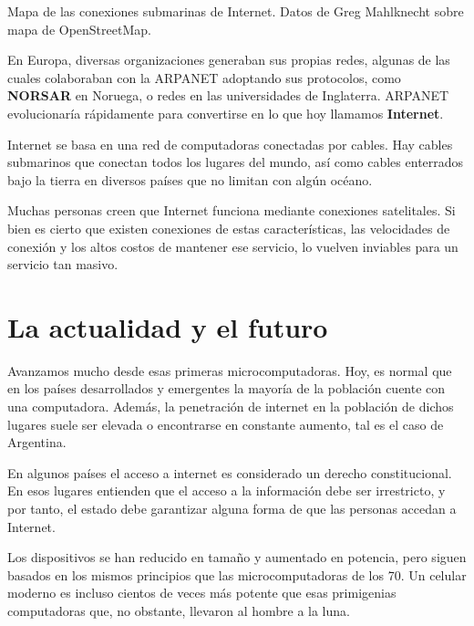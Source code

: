 {Mapa de las conexiones submarinas de Internet.}
{Datos de Greg Mahlknecht sobre mapa de OpenStreetMap.}

En Europa, diversas organizaciones generaban sus propias redes, algunas de las
cuales colaboraban con la ARPANET adoptando sus protocolos, como \textbf{NORSAR}
en Noruega, o redes en las universidades de Inglaterra. ARPANET evolucionaría
rápidamente para convertirse en lo que hoy llamamos \textbf{Internet}.\autocite{hafner_1998}

\begin{knowwhat}
Internet se basa en una red de computadoras conectadas por cables. Hay cables
submarinos que conectan todos los lugares del mundo, así como cables enterrados
bajo la tierra en diversos países que no limitan con algún océano.

Muchas personas creen que Internet funciona mediante conexiones satelitales. Si
bien es cierto que existen conexiones de estas características, las velocidades
de conexión y los altos costos de mantener ese servicio, lo vuelven inviables
para un servicio tan masivo.
\end{knowwhat}

\section{La actualidad y el futuro}

Avanzamos mucho desde esas primeras microcomputadoras. Hoy, es normal que
en los países desarrollados y emergentes la mayoría de la población cuente con
una computadora. Además, la penetración de internet en la población de dichos
lugares suele ser elevada o encontrarse en constante aumento, tal es el caso de
Argentina.

\begin{knowwhat}
En algunos países el acceso a internet es considerado un derecho constitucional.
En esos lugares entienden que el acceso a la información debe ser irrestricto, y
por tanto, el estado debe garantizar alguna forma de que las personas accedan a
Internet.
\end{knowwhat}

Los dispositivos se han reducido en tamaño y aumentado en potencia, pero siguen
basados en los mismos principios que las microcomputadoras de los 70. Un celular
moderno es incluso cientos de veces más potente que esas primigenias computadoras
que, no obstante, llevaron al hombre a la luna.

